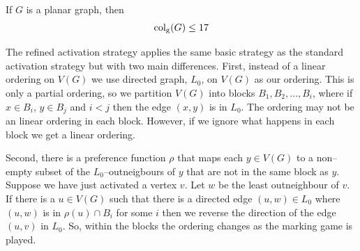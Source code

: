 \begin{theorem}
    If $G$ is a planar graph, then \[\operatorname{col_g}(G)\leq17\]
\end{theorem}

The refined activation strategy applies the same basic strategy as the standard activation strategy but with two main differences. First, instead of a linear ordering on $V(G)$ we use directed graph, $L_0$, on $V(G)$ as our ordering. This is only a partial ordering, so we partition $V(G)$ into blocks $B_1,B_2,\dots,B_i$, where if $x \in B_i$, $y \in B_j$ and $i < j$ then the edge $(x,y)$ is in $L_0$. The ordering may not be an linear ordering in each block. However, if we ignore what happens in each block we get a linear ordering.

Second, there is a preference function $\rho$ that maps each $y \in V(G)$ to a non--empty subset of the $L_0$--outneigbours of $y$ that are not in the same block as $y$. Suppose we have just activated a vertex $v$. Let $w$ be the least outneighbour of $v$. If there is a $u\in V(G)$ such that there is a directed edge $(u,w)\in L_0$ where $(u,w)$ is in $\rho(u)\cap B_i$ for some $i$ then we reverse the direction of the edge $(u,v)$ in $L_0$. So, within the blocks the ordering changes as the marking game is played.















